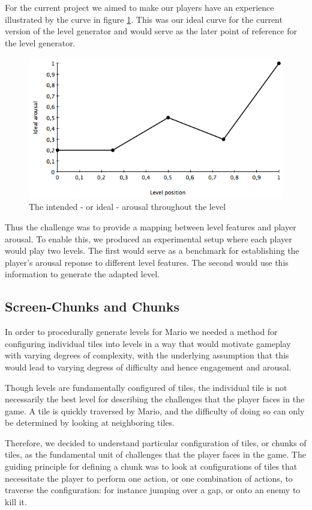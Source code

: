 \documentclass{llncs}
\begin{document}
For the current project we aimed to make our players have an experience illustrated by the curve in figure \ref{fig:ideal}. This was our ideal curve for the current version of the level generator and would serve as the later point of reference for the level generator.
\begin{figure}
\centering
\includegraphics[scale=0.4]{idealGraph.png}
\caption{The intended - or ideal - arousal throughout the level}
\label{fig:ideal}
\end{figure}
Thus the challenge was to provide a mapping between level features and player arousal. To enable this, we produced an experimental setup where each player would play two levels. The first would serve as a benchmark for establishing the player's arousal reponse to different level features. The second would use this information to generate the adapted level.

\subsection{Screen-Chunks and Chunks}
In order to procedurally generate levels for Mario we needed a method for configuring individual tiles into levels in a way that would motivate gameplay with varying degrees of complexity, with the underlying assumption that this would lead to varying degress of difficulty and hence engagement and arousal.

Though levels are fundamentally configured of tiles, the individual tile is not necessarily the best level for describing the challenges that the player faces in the game. A tile is quickly traversed by Mario, and the difficulty of doing so can only be determined by looking at neighboring tiles.

Therefore, we decided to understand particular configuration of tiles, or chunks of tiles, as the fundamental unit of challenges that the player faces in the game. The guiding principle for defining a chunk was to look at configurations of tiles that necessitate the player to perform one action, or one combination of actions, to traverse the configuration: for instance jumping over a gap, or onto an enemy to kill it.
\end{document}
